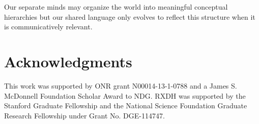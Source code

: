 \documentclass[10pt,letterpaper]{article}
\begin{document}
Our separate minds may organize the world into meaningful conceptual hierarchies but our shared language only evolves to reflect this structure when it is communicatively relevant. 


\section{\bf Acknowledgments}
\small
This work was supported by ONR grant N00014-13-1-0788 and a James S. McDonnell Foundation Scholar Award to NDG. RXDH was supported by the Stanford Graduate Fellowship and the National Science Foundation Graduate Research Fellowship under Grant No. DGE-114747.



\setlength{\bibleftmargin}{.125in}
\setlength{\bibindent}{-\bibleftmargin}


\end{document}
